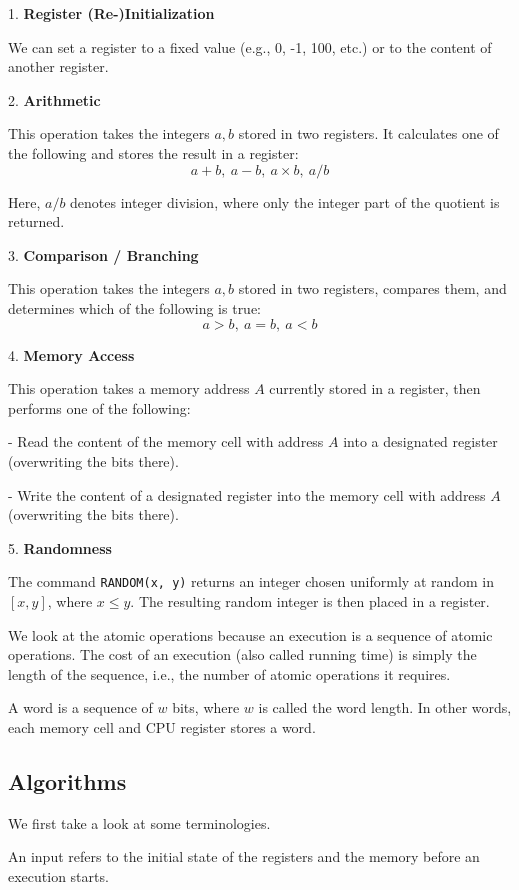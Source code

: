 1. \textbf{Register (Re-)Initialization} 

We can set a register to a fixed value (e.g., 0, -1, 100, etc.) or to the content of another register. 

2. \textbf{Arithmetic} 

This operation takes the integers \(a, b\) stored in two registers. It calculates one of the following and stores the result in a register:
\[
  a + b, \ a - b,\ a \times b,\ a / b
\]

\begin{remark}
  Here, \(a / b\) denotes integer division, where only the integer part of the quotient is returned.
\end{remark}

3. \textbf{Comparison / Branching}

This operation takes the integers \(a, b\) stored in two registers, compares them, and determines which of the following is true:
\[
  a > b, \ a = b,\ a < b
\]

4. \textbf{Memory Access}

This operation takes a memory address \(A\) currently stored in a register, then performs one of the following:

- Read the content of the memory cell with address \(A\) into a designated register (overwriting the bits there).

- Write the content of a designated register into the memory cell with address \(A\) (overwriting the bits there).

5. \textbf{Randomness} 

The command \texttt{RANDOM(x, y)} returns an integer chosen uniformly at random in \([x, y]\), where \(x \leq y\). The resulting random integer is then placed in a register.

We look at the atomic operations because an execution is a sequence of atomic operations. The cost of an execution (also called running time) is simply the length of the sequence, i.e., the number of atomic operations it requires. 

A word is a sequence of \(w\) bits, where \(w\) is called the word length. In other words, each memory cell and CPU register stores a word. 

\subsection{Algorithms}
We first take a look at some terminologies. 

An input refers to the initial state of the registers and the memory before an execution starts.

